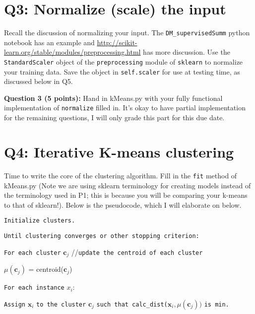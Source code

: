 \documentclass[11pt]{article}
\begin{document}
\section{Q3: Normalize (scale) the input}

Recall the discussion of normalizing your input. The \texttt{DM_supervisedSumm} python notebook has an example and 
\url{http://scikit-learn.org/stable/modules/preprocessing.html}
has more discussion. Use the \texttt{StandardScaler} object of the \texttt{preprocessing} module of \texttt{sklearn}
to normalize your training data. Save the object in \texttt{self.scaler}
for use at testing time, as discussed below in Q5.

\textbf{Question 3 (5 points):}
Hand in kMeans.py with your fully functional implementation of 
\texttt{normalize} filled in. It's okay to have partial implementation for the remaining questions, I will only grade this part for this due date.

\section{Q4: Iterative K-means clustering}

Time to write the core of the clustering algorithm. Fill in the \texttt{fit} method of kMeans.py (Note we are using sklearn terminology for creating models instead of the terminology used in P1; this is because you will be comparing your k-means to that of sklearn!).
Below is the pseudocode, which I will elaborate on below.

\pagebreak

\noindent\texttt{Initialize clusters.}

\noindent\texttt{Until clustering converges or other stopping criterion:}

\hspace{0.4cm} \texttt{For each cluster} $\mathbf{c}_j$ //\texttt{update the centroid of each cluster}

\hspace{1cm} $\mu(\mathbf{c}_j)$ = centroid($\mathbf{c}_j$)

\hspace{0.4cm} \texttt{For each instance} $x_i$:

\hspace{1cm} \texttt{Assign} $\mathbf{x}_i$  \texttt{to the cluster} $\mathbf{c}_j$ 
\texttt{such that calc\_dist(}$\mathbf{x}_i, \mu(\mathbf{c}_j))$ \texttt{is min.} 

\vspace{0.5cm}
\end{document}
